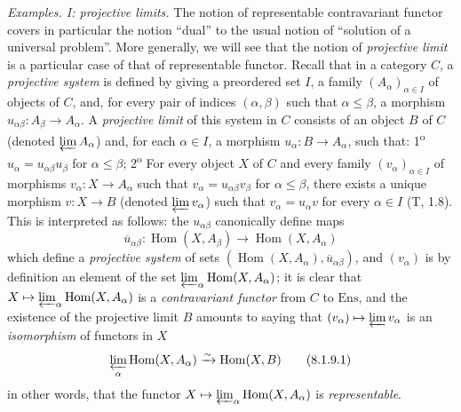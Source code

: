 \begin{env}[8.1.9]
\label{0.8.1.9}
\textit{Examples. I: projective limits.} The notion of representable
contravariant functor covers in particular the notion ``dual'' to
the usual notion of ``solution of a
universal problem''. More generally, we will see that the notion of
\emph{projective limit} is a particular case of that of representable
functor. Recall that in a category $C$, a \emph{projective system} is
defined by giving a preordered set $I$, a
family $(A_\alpha)_{\alpha\in I}$ of objects of $C$, and, for every pair
of indices $(\alpha,\beta)$ such that $\alpha\leq\beta$, a morphism
$u_{\alpha\beta}:A_\beta\to A_\alpha$. A \emph{projective limit} of this
system in $C$ consists of an object $B$ of $C$ (denoted
$\varprojlim A_\alpha$) and, for each $\alpha\in I$, a morphism
$u_\alpha:B\to A_\alpha$, such that: 1\textsuperscript{o}
$u_\alpha=u_{\alpha\beta}u_\beta$ for $\alpha\leq\beta$;
2\textsuperscript{o} For every object $X$ of $C$ and every family
$(v_\alpha)_{\alpha\in I}$ of morphisms $v_\alpha:X\to A_\alpha$ such
that $v_\alpha=u_{\alpha\beta}v_\beta$ for $\alpha\leq\beta$, there exists a
unique morphism $v:X\to B$ (denoted $\varprojlim v_\alpha$) such that
$v_\alpha=u_\alpha v$ for every $\alpha\in I$ (T, 1.8). This is interpreted
as follows: the $u_{\alpha\beta}$ canonically define
maps
\[
  \overline{u}_{\alpha\beta}:\operatorname{Hom}(X,A_\beta)
  \to\operatorname{Hom}(X,A_\alpha)
\]
which define a \emph{projective system} of sets
$(\operatorname{Hom}(X,A_\alpha),\overline{u}_{\alpha\beta})$, and
$(v_\alpha)$ is by definition an element of the set
$\varprojlim_\alpha\operatorname{Hom}(X,A_\alpha)$; it is clear that
$X\mapsto\varprojlim_\alpha\operatorname{Hom}(X,A_\alpha)$ is a
\emph{contravariant functor} from $C$ to $\mathrm{Ens}$, and the existence of
the projective limit $B$ amounts to saying that
$(v_\alpha)\mapsto\varprojlim v_\alpha$ is an \emph{isomorphism} of
functors in $X$
\[
  \varprojlim_\alpha\operatorname{Hom}(X,A_\alpha)
  \xrightarrow{\sim}\operatorname{Hom}(X,B)
  \tag{8.1.9.1}\label{0.8.1.9.1}
\]
in other words, that the functor
$X\mapsto\varprojlim_\alpha\operatorname{Hom}(X,A_\alpha)$ is
\emph{representable}.
\end{env}

